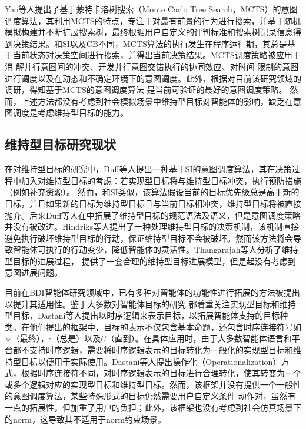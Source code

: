 Yao等人提出了基于蒙特卡洛树搜索（Monte Carlo Tree Search，MCTS）的意图调度算法\cite{DBLP:conf/aaai/YaoLT16,DBLP:conf/atal/YaoL16,DBLP:conf/ecai/YaoLT14,DBLP:conf/atal/Yao21,DBLP:conf/ijcai/Yao20,DBLP:conf/ecai/YaoLT16}，其利用MCTS的特点，专注于对最有前景的行为进行搜索，并基于随机模拟构建并不断扩展搜索树，最终根据用户自定义的评判标准和搜索树记录信息得到决策结果。和SI以及CB不同，MCTS算法的执行发生在程序运行期，其总是基于当前状态对决策空间进行搜索，并得出当前决策结果。MCTS调度策略被应用于消 解并行意图间的冲突、开发并行意图交错执行的协同效应、对时间 限制的意图进行调度以及在动态和不确定环境下的意图调度。此外，根据对目前该研究领域的调研，得知基于MCTS的意图调度算法 是当前可验证的最好的意图调度策略。
然而，上述方法都没有考虑到社会模拟场景中维持型目标对智能体的影响，缺乏在意图调度是考虑维持型目标的能力。


\subsection{维持型目标研究现状}
在对维持型目标的研究中，Duff等人提出一种基于SI的意图调度算法\cite{DBLP:conf/atal/DuffHT06}，其在决策过程中加入对维持型目标的考虑：若实现型目标将与维持型目标冲突，执行预防措施（例如补充资源）。 然而，和SI类似，该算法假设当前的目标优先级总是高于新的目标，并且如果新的目标为维持型目标且与当前目标相冲突，维持型目标将被直接抛弃。后来Duff等人在\cite{DBLP:journals/ci/DuffTH14}中拓展了维持型目标的规范语法及语义，但是意图调度策略并没有被改进。Hindriks等人\cite{DBLP:conf/dalt/HindriksR07}提出了一种处理维持型目标的决策机制，该机制直接避免执行破坏维持型目标的行动，保证维持型目标不会被破坏。然而该方法将会导致智能体可执行的行动变少，降低智能体的灵活性。Thangarajah等人\cite{DBLP:conf/ecai/ThangarajahHMY14}分析了维持型目标的进展过程， 提供了一套合理的维持型目标进展模型，但是起没有考虑到意图进展问题。

目前在BDI智能体研究领域中，已有多种对智能体的功能性进行拓展的方法被提出以提升其适用性。鉴于大多数对智能体目标的研究 都着重关注实现型目标和维持型目标，Dastani等人\cite{DBLP:conf/atal/DastaniRW11}提出以时序逻辑来表示目标，以拓展智能体支持的目标种类。在他们提出的框架中，目标的表示不仅包含基本命题，还包含时序连接符号如$\diamond$（最终），$\square$（总是）以及$U$（直到）。在具体应用时，由于大多数智能体语言和平台都不支持时序逻辑，需要将时序逻辑表示的目标转化为一般化的实现型目标和维持型目标以便用于实际使用。Dastani等人提出操作化（Operationalization）方式，根据时序连接符不同，对时序逻辑表示的目标进行合理转化，使其转变为一个或多个逻辑对应的实现型目标和维持型目标。然而，该框架并没有提供一个一般性的意图调度算法，某些特殊形式的目标仍然需要用户自定义条件-动作对，虽然有一点的拓展性，但加重了用户的负担；此外，该框架也没有考虑到社会仿真场景下的norm，这导致其不适用于norm约束场景。
